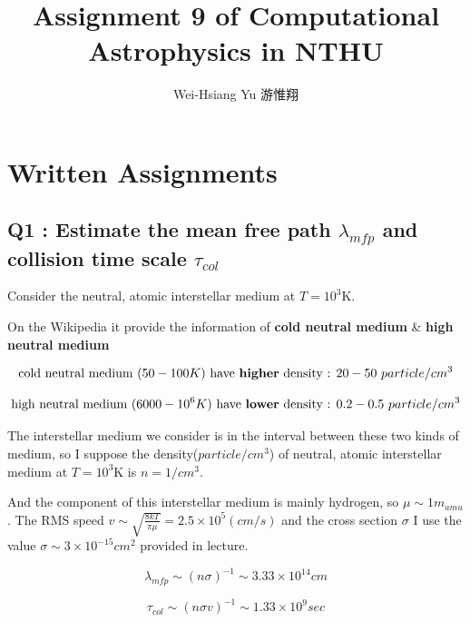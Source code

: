 \documentclass{article}
\title{Assignment 9 of Computational Astrophysics in NTHU}
\author{Wei-Hsiang Yu 游惟翔}
\affil{Department of Physics, National Tsing Hua University, Hsinchu, Taiwan}
\begin{document}
\begin{CJK}{UTF8}{bsmi}
\maketitle
\end{CJK}


\section{Written Assignments}
\subsection*{Q1 : Estimate the mean free path $\lambda_{mfp}$ and collision time scale $\tau_{col}$}

Consider the neutral, atomic interstellar medium at $T=10^3$K.

On the Wikipedia\cite{b1} it provide the information of \textbf{cold neutral medium} \& \textbf{high neutral medium}

$$
\mbox{cold neutral medium  } (50-100K)
\mbox{     have \textbf{higher} density : }20-50
\ particle/cm^3
$$

$$
\mbox{high neutral medium  } (6000-10^{6}K)
\mbox{  have \textbf{lower} density : }0.2-0.5
\ particle/cm^3
$$

The interstellar medium we consider is in the interval between these two kinds of medium, so I suppose the density($particle/cm^3$) of neutral, atomic interstellar medium at $T=10^3$K is $n=1/cm^3$.

And the component of this interstellar medium is mainly hydrogen, so $\mu \sim 1m_{amu}$. The RMS speed $v \sim \sqrt{\frac{8kT}{\pi \mu}}=2.5 \times 10^5(cm/s)$
and the cross section $\sigma$ I use the value $\sigma \sim 3\times10^{-15} cm^2$ provided in lecture.


\begin{equation}
    \lambda_{mfp}\sim (n\sigma)^{-1} \sim 3.33\times10^{14}cm
    \label{eq:lambda}
\end{equation}

\begin{equation}
    \tau_{col}\sim (n\sigma v)^{-1} \sim 1.33\times10^{9}sec
    \label{eq:tau}
\end{equation}
\end{document}

